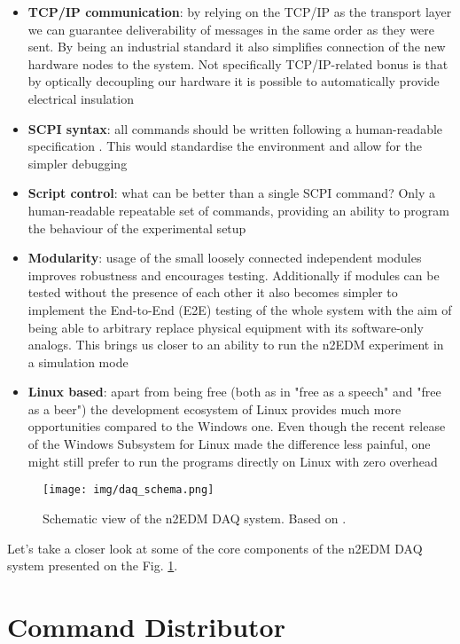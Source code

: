 \begin{itemize}
	\item \textbf{TCP/IP communication}: by relying on the TCP/IP as the transport layer we can guarantee deliverability of messages in the same order as they were sent. By being an industrial standard it also simplifies connection of the new hardware nodes to the system. Not specifically TCP/IP-related bonus is that by optically decoupling our hardware it is possible to automatically provide electrical insulation
	\item \textbf{SCPI syntax}: all commands should be written following a human-readable specification \cite{SCPIConsortium1999}. This would standardise the environment and allow for the simpler debugging
	\item \textbf{Script control}: what can be better than a single SCPI command? Only a human-readable repeatable set of commands, providing an ability to program the behaviour of the experimental setup
	\item \textbf{Modularity}: usage of the small loosely connected independent modules improves robustness and encourages testing. Additionally if modules can be tested without the presence of each other it also becomes simpler to implement the End-to-End (E2E) testing of the whole system with the aim of being able to arbitrary replace physical equipment with its software-only analogs. This brings us closer to an ability to run the n2EDM experiment in a simulation mode
	\item \textbf{Linux based}: apart from being free (both as in "free as a speech" and "free as a beer") the development ecosystem of Linux provides much more opportunities compared to the Windows one. Even though the recent release \cite{Loewen2019} of the Windows Subsystem for Linux made the difference less painful, one might still prefer to run the programs directly on Linux with zero overhead
\end{itemize}

\begin{figure}[h]
	\centering
	\texttt{[image: img/daq\_schema.png]}
	\caption{Schematic view of the n2EDM DAQ system. Based on \cite{Bison2018}.}
	\label{fig:daq_schema}
\end{figure}

Let's take a closer look at some of the core components of the n2EDM DAQ system presented on the Fig. \ref{fig:daq_schema}.

\section{Command Distributor}
\label{sec:distributor}

